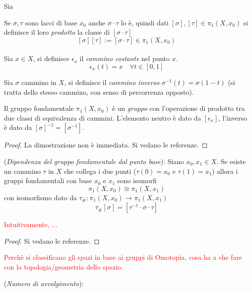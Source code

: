 \begin{definition}
   Sia
\end{definition}

Se $\sigma,\tau$ sono lacci di base $x_0$ anche $\sigma \cdot \tau$ lo è, quindi
dati $[\sigma],[\tau] \in \pi_1(X,x_0)$ si definisce il loro \emph{prodotto}
la classe di $[\sigma \cdot \tau]$
$$ [\sigma][\tau] := [\sigma\cdot\tau] \in \pi_1(X,x_0) $$\\

Sia $x \in X$, si definisce $\epsilon_x$ il \emph{cammino costante} nel punto $x$.
$$\epsilon_x(t) = x \quad \forall t \in[0,1]$$

Sia $\sigma$ cammino in $X$, si definisce il \emph{cammino inverso}
$\sigma^{-1}(t) = \sigma(1-t)$ (si tratta dello stesso cammino, con senso
di percorrenza opposto).

\begin{proposition}
   Il gruppo fondamentale $\pi_1(X,x_0)$ è un \emph{gruppo} con l'operazione di
   prodotto tra due classi di equivalenza di cammini.
   L'elemento neutro è dato da $[\epsilon_x]$,
   l'inverso è dato da $[\sigma]^{-1} = [\sigma^{-1}]$.
\end{proposition}
\begin{proof}
   La dimostrazione non è immediata. Si vedano le referenze.
\end{proof}

\begin{proposition}(\emph{Dipendenza del gruppo fondamentale dal punto base}):
   Siano $x_0, x_1 \in X$. Se esiste un cammino $\tau$ in $X$ che collega i due
   punti ($\tau(0)=x_0$ e $\tau(1)=x_1$) allora i gruppi fondamentali con base
   $x_0$ e $x_1$ sono isomorfi
      $$ \pi_1(X,x_0) \cong \pi_1(X,x_1) $$
   con isomorfismo dato da $\tau_\# : \pi_1(X,x_0) \to \pi_1(X,x_1)$
      $$  \tau_\# [\sigma] = [\tau^{-1} \cdot \sigma \cdot \tau] $$
\end{proposition}
\textcolor{red}{Intuitivamente, ...}
\begin{proof} Si vedano le referenze. \end{proof}

\textcolor{red}{Perchè si classificano gli spazi in base ai gruppi di Omotopia,
cosa ha a che fare con la topologia/geometria dello spazio.}\\
\begin{definition}(\emph{Numero di avvolgimento}):

\end{definition}
